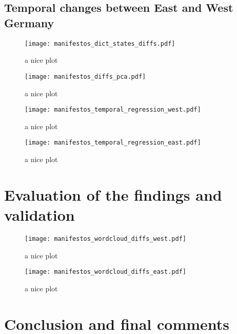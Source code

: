 \documentclass[a4paper]{scrreprt}
\begin{document}
\section{Temporal changes between East and West Germany}
\begin{figure}
    \centering
    \texttt{[image: manifestos\_dict\_states\_diffs.pdf]}
    \caption{a nice plot}
\end{figure}
\begin{figure}
    \centering
    \texttt{[image: manifestos\_diffs\_pca.pdf]}
    \caption{a nice plot}
\end{figure}
\begin{figure}
    \centering
    \texttt{[image: manifestos\_temporal\_regression\_west.pdf]}
    \caption{a nice plot}
\end{figure}
\begin{figure}
    \centering
    \texttt{[image: manifestos\_temporal\_regression\_east.pdf]}
    \caption{a nice plot}
\end{figure}
\chapter{Evaluation of the findings and validation}
\begin{figure}
    \centering
    \texttt{[image: manifestos\_wordcloud\_diffs\_west.pdf]}
    \caption{a nice plot}
\end{figure}
\begin{figure}
    \centering
    \texttt{[image: manifestos\_wordcloud\_diffs\_east.pdf]}
    \caption{a nice plot}
\end{figure}
\chapter{Conclusion and final comments}


\end{document}
